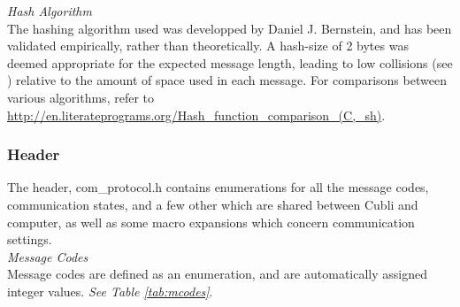 \textit{Hash Algorithm}\\

The hashing algorithm used was developped by Daniel J. Bernstein, and has been validated empirically, rather than theoretically. A hash-size of 2 bytes was deemed appropriate for the expected message length, leading to low collisions (see \cite{hashing}) relative to the amount of space used in each message. For comparisons between various algorithms, refer to \url{http://en.literateprograms.org/Hash_function_comparison_(C,_sh)}.

\subsubsection{Header}

The header, com\_protocol.h contains enumerations for all the message codes, communication states, and a few other which are shared between Cubli and computer, as well as some macro expansions which concern communication settings.\\

\textit{Message Codes}\\

Message codes are defined as an enumeration, and are automatically assigned integer values. \textit{See Table \ref{tab:mcodes}}.\\


